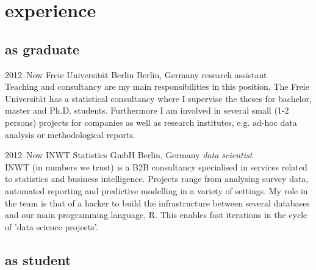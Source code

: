 \documentclass[]{friggeri-cv} %
\begin{document}

\section{experience}

\subsection{as graduate}

\begin{entrylist}


\entry
{2012--Now}
{Freie Universit\"at Berlin}
{Berlin, Germany}
{research assistant \\
Teaching and consultancy are my main responsibilities in this position. The Freie Universit\"at has a statistical consultancy where I supervise the theses for bachelor, master and Ph.D. students. Furthermore I am involved in several small (1-2 persons) projects for companies as well as research institutes, e.g. ad-hoc data analysis or methodological reports.}


\entry
{2012--Now}
{INWT Statistics GmbH}
{Berlin, Germany}
{\emph{data scientist} \\ 
INWT (in numbers we trust) is a B2B consultancy specialised in services related to statistics and business intelligence. Projects range from analysing survey data, automated reporting and predictive modelling in a variety of settings. My role in the team is that of a hacker to build the infrastructure between several databases and our main programming language, R. This enables fast iterations in the cycle of 'data science projects'.
}


\end{entrylist}


\subsection{as student}
\end{document}
